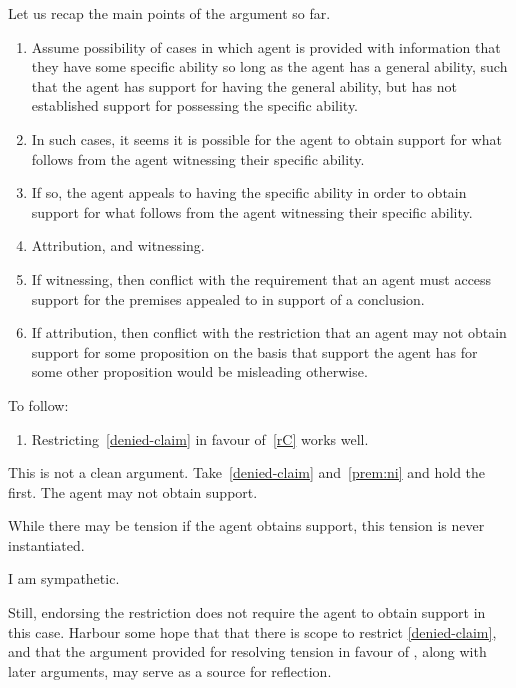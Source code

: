 \documentclass[10pt]{article}
\begin{document}
\begin{note}
  Let us recap the main points of the argument so far.
  \begin{enumerate}
  \item Assume possibility of cases in which agent is provided with information that they have some specific ability so long as the agent has a general ability, such that the agent has support for having the general ability, but has not established support for possessing the specific ability.
  \item In such cases, it seems it is possible for the agent to obtain support for what follows from the agent witnessing their specific ability.
  \item If so, the agent appeals to having the specific ability in order to obtain support for what follows from the agent witnessing their specific ability.
  \item Attribution, and witnessing.
  \item If witnessing, then conflict with the requirement that an agent must access support for the premises appealed to in support of a conclusion.
  \item If attribution, then conflict with the restriction that an agent may not obtain support for some proposition on the basis that support the agent has for some other proposition would be misleading otherwise.
  \end{enumerate}

  To follow:
  \begin{enumerate}
  \item Restricting~\ref{denied-claim} in favour of~\ref{rC} works well.
  \end{enumerate}
\end{note}

\begin{note}
  This is not a clean argument.
  Take~\ref{denied-claim} and~\ref{prem:ni} and hold the first.
  The agent may not obtain support.

  While there may be tension if the agent obtains support, this tension is never instantiated.

  I am sympathetic.

  Still, endorsing the restriction does not require the agent to obtain support in this case.
  Harbour some hope that that there is scope to restrict \ref{denied-claim}, and that the argument provided for resolving tension in favour of \rC{}, along with later arguments, may serve as a source for reflection.
\end{note}
\end{document}
